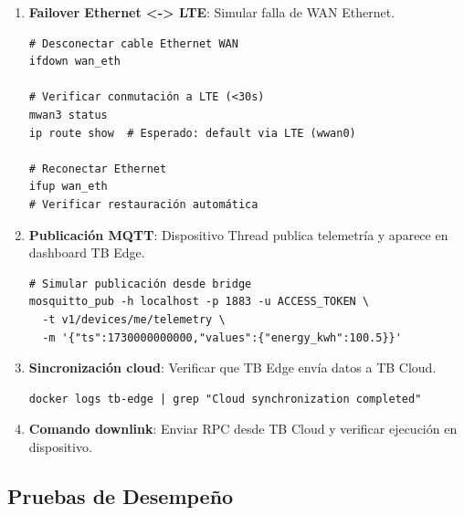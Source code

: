 \begin{enumerate}
    \item \textbf{Failover Ethernet <-> LTE}: Simular falla de WAN Ethernet.
    \begin{verbatim}
# Desconectar cable Ethernet WAN
ifdown wan_eth

# Verificar conmutación a LTE (<30s)
mwan3 status
ip route show  # Esperado: default via LTE (wwan0)

# Reconectar Ethernet
ifup wan_eth
# Verificar restauración automática
    \end{verbatim}
    
    \item \textbf{Publicación MQTT}: Dispositivo Thread publica telemetría y aparece en dashboard TB Edge.
    \begin{verbatim}
# Simular publicación desde bridge
mosquitto_pub -h localhost -p 1883 -u ACCESS_TOKEN \
  -t v1/devices/me/telemetry \
  -m '{"ts":1730000000000,"values":{"energy_kwh":100.5}}'
    \end{verbatim}
    
    \item \textbf{Sincronización cloud}: Verificar que TB Edge envía datos a TB Cloud.
    \begin{verbatim}
docker logs tb-edge | grep "Cloud synchronization completed"
    \end{verbatim}
    
    \item \textbf{Comando downlink}: Enviar RPC desde TB Cloud y verificar ejecución en dispositivo.
\end{enumerate}

\subsection{Pruebas de Desempeño}

